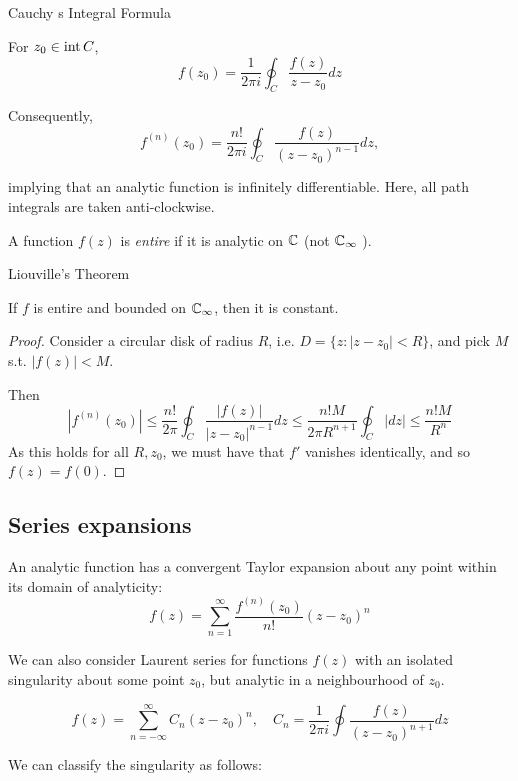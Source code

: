 \documentclass[a4paper]{article}
\begin{document}
\begin{thm} Cauchy s Integral Formula
	
	For $z_0 \in \operatorname{int} C $, 
	\[
		f(z_0) = \frac{1}{2\pi i} \oint_C \frac{f(z)}{z-z_0} dz
	\]

	Consequently, 
	\[
		f^{(n)}(z_0) = \frac{n!}{2\pi i} \oint_C \frac{f(z)}{(z-z_0)^{n-1}} dz
	,\]
	
	implying that an analytic function is infinitely differentiable. 
	Here, all path integrals are taken anti-clockwise. 
\end{thm}

\begin{defn}
	A function $f(z)$ is \textit{entire} if it is analytic on $\mathbb{C}$ (not  $\mathbb{C}_{\infty}$ ).
\end{defn}

\begin{thm} Liouville's Theorem

	If $f$ is entire and bounded on $\mathbb{C}_{\infty}$, then it is constant. 
	
\end{thm}

\begin{proof}
	Consider a circular disk of radius $R$, i.e. $D = \{z: |z-z_0| < R\}$, and pick $M$ s.t. $|f(z)| < M$.

	Then \[
		|f^{(n)}(z_0)| \le \frac{n!}{2\pi} \oint_{C} \frac{|f(z)|}{|z-z_0|^{n-1}} dz \le \frac{n!M}{2\pi R^{n+1}} \oint_C |dz| \le \frac{n!M}{R^{n}}
	\]
	As this holds for all $R, z_0$, we must have that $f'$ vanishes identically, and so $f(z) = f(0)$. 
\end{proof}

\subsection{Series expansions}

An analytic function has a convergent Taylor expansion about any point within its domain of analyticity:
\[
	f(z) = \sum_{n=1}^{\infty} \frac{f^{(n)}(z_0)}{n!} (z-z_0)^{n}

\] 

We can also consider Laurent series for functions $f(z)$ with an isolated singularity about some point $z_0$, but analytic in a neighbourhood of $z_0$.

\[
	f(z) = \sum_{n=-\infty}^{\infty} C_n (z-z_0)^n, \quad C_n = \frac{1}{2\pi i} \oint \frac{f(z)}{(z-z_0)^{n+1}} dz
\] 

We can classify the singularity as follows:
\end{document}
